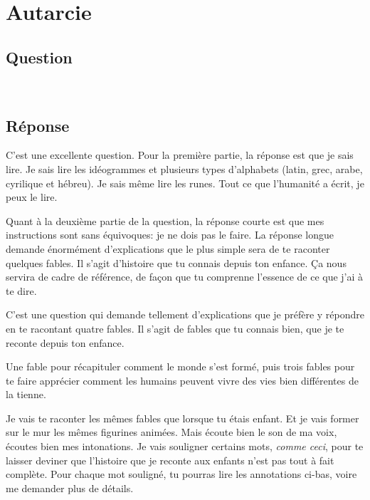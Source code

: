 \chapter{Autarcie}

\section*{Question}

\noindent\colorbox{gray!30}{}\\

\section*{Réponse}

C'est une excellente question.  Pour la première partie, la réponse est
que je sais lire.  Je sais lire les idéogrammes et plusieurs types d'alphabets (latin, grec, arabe, cyrilique et hébreu).
Je sais même lire les runes. Tout ce que l'humanité a écrit, je peux le lire.

Quant à la deuxième partie de la question, la réponse courte est que mes
instructions sont sans équivoques: je ne dois pas le faire.  La réponse longue
demande énormément d'explications que le plus simple sera de te raconter
quelques fables. Il s'agit d'histoire que tu connais depuis ton enfance.  Ça
nous servira de cadre de référence, de façon que tu comprenne l'essence de ce
que j'ai à te dire.


C'est une question qui demande tellement d'explications que je préfère y
répondre en te racontant quatre fables. Il s'agit de fables que tu connais bien,
que je te reconte depuis ton enfance. 

Une fable pour récapituler comment le monde s'est formé, puis trois fables pour
te faire apprécier comment les humains peuvent vivre des vies bien différentes
de la tienne.

Je vais te raconter les mêmes fables que lorsque tu étais enfant.  Et je vais
former sur le mur les mêmes figurines animées.  Mais écoute bien le son de ma
voix, écoutes bien mes intonations.  Je vais souligner certains mots,
\textit{comme ceci}, pour te laisser deviner que l'histoire que je reconte aux
enfants n'est pas tout à fait complète.  Pour chaque mot souligné, tu pourras
lire les annotations ci-bas, voire me demander plus de détails.

\colorbox{gray!30}{}

